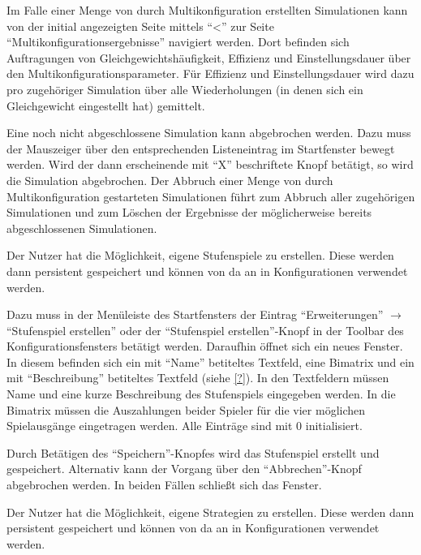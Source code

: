 \documentclass[parskip=full,11pt]{scrartcl}
\begin{document}
Im Falle einer Menge von durch Multikonfiguration erstellten Simulationen kann von der initial angezeigten Seite mittels \enquote{<} zur Seite \enquote{Multikonfigurationsergebnisse} navigiert werden. Dort befinden sich Auftragungen von Gleichgewichtshäufigkeit, Effizienz und Einstellungsdauer über den Multikonfigurationsparameter. Für Effizienz und Einstellungsdauer wird dazu pro zugehöriger Simulation über alle Wiederholungen (in denen sich ein Gleichgewicht eingestellt hat) gemittelt.

Eine noch nicht abgeschlossene Simulation kann abgebrochen werden. Dazu muss der Mauszeiger über den entsprechenden Listeneintrag im Startfenster bewegt werden. Wird der dann erscheinende mit \enquote{X} beschriftete Knopf betätigt, so wird die Simulation abgebrochen. Der Abbruch einer Menge von durch Multikonfiguration gestarteten Simulationen führt zum Abbruch aller zugehörigen Simulationen und zum Löschen der Ergebnisse der möglicherweise bereits abgeschlossenen Simulationen.

Der Nutzer hat die Möglichkeit, eigene Stufenspiele zu erstellen. Diese werden dann persistent gespeichert und können von da an in Konfigurationen verwendet werden.

Dazu muss in der Menüleiste des Startfensters der Eintrag \enquote{Erweiterungen} \(\rightarrow\) \enquote{Stufenspiel erstellen} oder der \enquote{Stufenspiel erstellen}-Knopf in der Toolbar des Konfigurationsfensters betätigt werden. Daraufhin öffnet sich ein neues Fenster. In diesem befinden sich ein mit \enquote{Name} betiteltes Textfeld, eine Bimatrix und ein mit \enquote{Beschreibung} betiteltes Textfeld (siehe \cref{?}). In den Textfeldern müssen Name und eine kurze Beschreibung des Stufenspiels eingegeben werden. In die Bimatrix müssen die Auszahlungen beider Spieler für die vier möglichen Spielausgänge eingetragen werden. Alle Einträge sind mit \(0\) initialisiert.

Durch Betätigen des \enquote{Speichern}-Knopfes wird das Stufenspiel erstellt und gespeichert. Alternativ kann der Vorgang über den \enquote{Abbrechen}-Knopf abgebrochen werden. In beiden Fällen schließt sich das Fenster.

Der Nutzer hat die Möglichkeit, eigene Strategien zu erstellen. Diese werden dann persistent gespeichert und können von da an in Konfigurationen verwendet werden.
\end{document}
